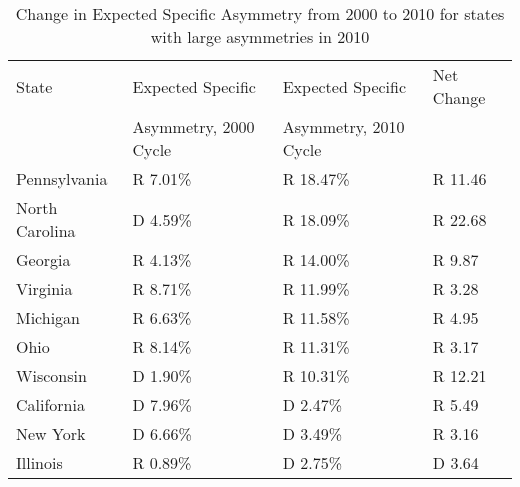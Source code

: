 \begin{table}[htb!]
\centering
\caption{Change in Expected Specific Asymmetry from 2000 to 2010 for states with large asymmetries in 2010 \label{tab:Asym2000to2010}}
\begin{tabular}{|l|l|l|l|}
\hline
State & Expected Specific     & Expected Specific & Net Change\\
      & Asymmetry, 2000 Cycle & Asymmetry, 2010 Cycle & \\
\hline
\hline
Pennsylvania & R 7.01\% & R 18.47\% & R 11.46\\
\hline
North Carolina & D 4.59\% & R 18.09\% & R 22.68\\
\hline
Georgia & R 4.13\% & R 14.00\% & R 9.87\\
\hline
Virginia & R 8.71\% & R 11.99\% & R 3.28\\
\hline
Michigan & R 6.63\% & R 11.58\% & R 4.95\\
\hline
Ohio & R 8.14\% & R 11.31\% & R 3.17\\
\hline
Wisconsin & D 1.90\% & R 10.31\% & R 12.21\\
\hline
California & D 7.96\% & D 2.47\% & R 5.49\\
\hline
New York & D 6.66\% & D 3.49\% & R 3.16\\
\hline
Illinois & R 0.89\% & D 2.75\% & D 3.64\\
\hline
\end{tabular}
\end{table}
